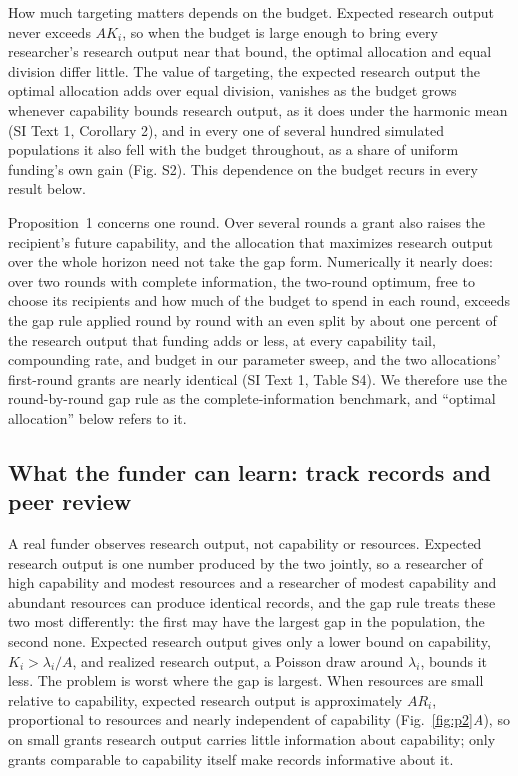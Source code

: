 \documentclass[9pt,twocolumn,twoside]{pnas-new}
\begin{document}
How much targeting matters depends on the budget. Expected research output never exceeds $AK_i$, so when the budget is large enough to bring every researcher's research output near that bound, the optimal allocation and equal division differ little. The value of targeting, the expected research output the optimal allocation adds over equal division, vanishes as the budget grows whenever capability bounds research output, as it does under the harmonic mean (SI Text 1, Corollary 2), and in every one of several hundred simulated populations it also fell with the budget throughout, as a share of uniform funding's own gain (Fig. S2). This dependence on the budget recurs in every result below.

Proposition~1 concerns one round. Over several rounds a grant also raises the recipient's future capability, and the allocation that maximizes research output over the whole horizon need not take the gap form. Numerically it nearly does: over two rounds with complete information, the two-round optimum, free to choose its recipients and how much of the budget to spend in each round, exceeds the gap rule applied round by round with an even split by about one percent of the research output that funding adds or less, at every capability tail, compounding rate, and budget in our parameter sweep, and the two allocations' first-round grants are nearly identical (SI Text 1, Table S4). We therefore use the round-by-round gap rule as the complete-information benchmark, and ``optimal allocation'' below refers to it.



\subsection*{What the funder can learn: track records and peer review}
A real funder observes research output, not capability or resources. Expected research output is one number produced by the two jointly, so a researcher of high capability and modest resources and a researcher of modest capability and abundant resources can produce identical records, and the gap rule treats these two most differently: the first may have the largest gap in the population, the second none. Expected research output gives only a lower bound on capability, $K_i > \lambda_i/A$, and realized research output, a Poisson draw around $\lambda_i$, bounds it less. The problem is worst where the gap is largest. When resources are small relative to capability, expected research output is approximately $AR_i$, proportional to resources and nearly independent of capability (Fig.~\ref{fig:p2}\textit{A}), so on small grants research output carries little information about capability; only grants comparable to capability itself make records informative about it.
\end{document}
